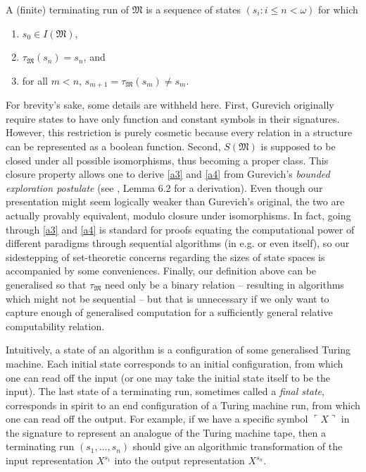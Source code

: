 \documentclass[12pt, twoside]{memoir}
\numberwithin{equation}{section}
\theoremstyle{definition}
\theoremstyle{remark}
\theoremstyle{definition}
\theoremstyle{definition}
\theoremstyle{definition}
\theoremstyle{remark}
\begin{document}
A (finite) terminating run of $\mathfrak{M}$ is a sequence of states $(s_i : i \leq n < \omega)$ for which
\begin{enumerate}[label=(B\arabic*)]
    \item $s_0 \in I(\mathfrak{M})$,
    \item $\tau_{\mathfrak{M}}(s_n) = s_n$, and
    \item for all $m < n$, $s_{m+1} = \tau_{\mathfrak{M}}(s_m) \neq s_m$.
\end{enumerate}

For brevity's sake, some details are withheld here. First, Gurevich originally require states to have only function and constant symbols in their signatures. However, this restriction is purely cosmetic because every relation in a structure can be represented as a boolean function. Second, $S(\mathfrak{M})$ is supposed to be closed under all possible isomorphisms, thus becoming a proper class. This closure property allows one to derive \ref{a3} and \ref{a4} from Gurevich's \emph{bounded exploration postulate} (see \cite{gurevich}, Lemma 6.2 for a derivation). Even though our presentation might seem logically weaker than Gurevich's original, the two are actually provably equivalent, modulo closure under isomorphisms. In fact, going through \ref{a3} and \ref{a4} is standard for proofs equating the computational power of different paradigms through sequential algorithms (in e.g. \cite{dershowitz} or even \cite{gurevich} itself), so our sidestepping of set-theoretic concerns regarding the sizes of state spaces is accompanied by some conveniences. Finally, our definition above can be generalised so that $\tau_{\mathfrak{M}}$ need only be a binary relation -- resulting in algorithms which might not be sequential -- but that is unnecessary if we only want to capture enough of generalised computation for a sufficiently general relative computability relation.

Intuitively, a state of an algorithm is a configuration of some generalised Turing machine. Each initial state corresponds to an initial configuration, from which one can read off the input (or one may take the initial state itself to be the input). The last state of a terminating run, sometimes called a \emph{final state}, corresponds in spirit to an end configuration of a Turing machine run, from which one can read off the output. For example, if we have a specific symbol $\ulcorner X \urcorner$ in the signature to represent an analogue of the Turing machine tape, then a terminating run $(s_1, \dots, s_n)$ should give an algorithmic transformation of the input representation $X^{s_1}$ into the output representation $X^{s_n}$.
\end{document}
